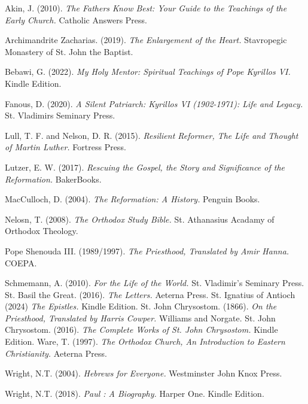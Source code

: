 \documentclass[12pt,doc]{apa7}   	%
\begin{document}
\begin{thebibliography}{15}

Akin, J. (2010). \emph{The Fathers Know Best: Your Guide to the Teachings of the Early Church.} Catholic Answers Press.
    
Archimandrite Zacharias. (2019). \emph{The Enlargement of the Heart.} Stavropegic Monastery of St. John the Baptist.

Bebawi, G. (2022). \emph{My Holy Mentor: Spiritual Teachings of Pope Kyrillos VI.} Kindle Edition.

Fanous, D. (2020). \emph{A Silent Patriarch: Kyrillos VI (1902-1971): Life and Legacy.} St. Vladimirs Seminary Press.

Lull, T. F. and Nelson, D. R. (2015). \emph{Resilient Reformer, The Life and Thought of Martin Luther.} Fortress Press.

Lutzer, E. W. (2017). \emph{Rescuing the Gospel, the Story and Significance of the Reformation.} BakerBooks.

MacCulloch, D. (2004). \emph{The Reformation: A History.} Penguin Books.

Nelosn, T. (2008). \emph{The Orthodox Study Bible.} St. Athanasius Acadamy of Orthodox Theology.

Pope Shenouda III. (1989/1997). \emph{The Priesthood, Translated by Amir Hanna.} COEPA. 

Schmemann, A. (2010). \emph{For the Life of the World.} St. Vladimir's Seminary Press.
St. Basil the Great. (2016). \emph{The Letters.} Aeterna Press.
St. Ignatius of Antioch (2024) \emph{The Epistles.} Kindle Edition.
St. John Chrysostom.  (1866). \emph{On the Priesthood, Translated by Harris Cowper.}  Williams and Norgate. 
St. John Chrysostom.  (2016). \emph{The Complete Works of St. John Chrysostom.}  Kindle Edition. 
Ware, T. (1997). \emph{The Orthodox Church, An Introduction to Eastern Christianity.} Aeterna Press.

Wright, N.T. (2004). \emph{Hebrews for Everyone.} Westminster John Knox Press.


Wright, N.T. (2018). \emph{Paul : A Biography.} Harper One.  Kindle Edition.


\end{thebibliography}
\end{document}
